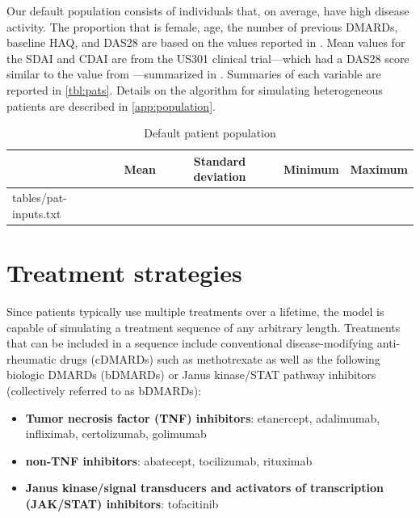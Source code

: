 \documentclass[11pt,final,fleqn]{article}\usepackage[]{graphicx}\usepackage[]{color}
\makeatletter
\theoremstyle{plain}
\newcommand*\ExpandableInput[1]{\@@input#1 }
\makeatother
\begin{document}
Our default population consists of individuals that, on average, have high disease activity. The proportion that is female, age, the number of previous DMARDs, baseline HAQ, and DAS28 are based on the values reported in \citet{curtis2010comparison}. Mean values for the SDAI and CDAI are from the US301 clinical trial---which had a DAS28 score similar to the value from \citet{curtis2010comparison}---summarized in \citet{smolen2003simplified}. Summaries of each variable are reported in \autoref{tbl:pats}. Details on the algorithm for simulating heterogeneous patients are described in \autoref{app:population}.

\begin{table}[!ht]
\begin{center}
\begin{threeparttable}
\caption{Default patient population} \label{tbl:pats}
\begin{tabularx}{\textwidth}{@{\extracolsep{\fill}}lcccc}
\hline
\multicolumn{1}{l}{} & \multicolumn{1}{c}{Mean} & \multicolumn{1}{c}{Standard deviation} & \multicolumn{1}{c}{Minimum} & \multicolumn{1}{c}{Maximum}\\
\hline
\ExpandableInput{tables/pat-inputs.txt}
\hline
\end{tabularx}
\scriptsize
\end{threeparttable}
\end{center}
\end{table}

\section{Treatment strategies}\label{sec:treatments}
Since patients typically use multiple treatments over a lifetime, the model is capable of simulating a treatment sequence of any arbitrary length. Treatments that can be included in a sequence include conventional disease-modifying anti-rheumatic drugs (cDMARDs) such as methotrexate as well as the following biologic DMARDs (bDMARDs) or Janus kinase/STAT pathway inhibitors (collectively referred to as bDMARDs):

\begin{itemize}
\item \textbf{Tumor necrosis factor (TNF) inhibitors}: etanercept, adalimumab, infliximab, certolizumab, golimumab
\item \textbf{non-TNF inhibitors}: abatecept, tocilizumab, rituximab
\item \textbf{Janus kinase/signal transducers and activators of transcription (JAK/STAT) inhibitors}: tofacitinib
\end{itemize}
\end{document}
